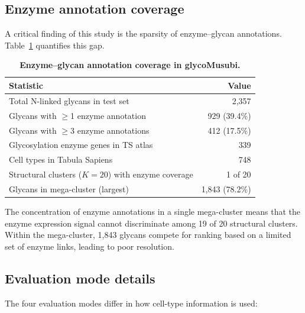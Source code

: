 \documentclass[11pt,a4paper]{article}
\begin{document}
\subsection{Enzyme annotation coverage}

A critical finding of this study is the sparsity of enzyme--glycan annotations.
Table~\ref{tab:enzyme_coverage} quantifies this gap.

\begin{table}[H]
\centering
\caption{\textbf{Enzyme--glycan annotation coverage in glycoMusubi.}}
\label{tab:enzyme_coverage}
\small
\begin{tabular}{lr}
\toprule
\textbf{Statistic} & \textbf{Value} \\
\midrule
Total N-linked glycans in test set      & 2,357 \\
Glycans with $\geq$1 enzyme annotation  & 929 (39.4\%) \\
Glycans with $\geq$3 enzyme annotations & 412 (17.5\%) \\
Glycosylation enzyme genes in TS atlas  & 339 \\
Cell types in Tabula Sapiens            & 748 \\
\midrule
Structural clusters ($K = 20$) with enzyme coverage & 1 of 20 \\
Glycans in mega-cluster (largest)       & 1,843 (78.2\%) \\
\bottomrule
\end{tabular}
\end{table}

The concentration of enzyme annotations in a single mega-cluster means that the
enzyme expression signal cannot discriminate among 19 of 20 structural clusters.
Within the mega-cluster, 1,843 glycans compete for ranking based on a limited
set of enzyme links, leading to poor resolution.

\subsection{Evaluation mode details}

The four evaluation modes differ in how cell-type information is used:
\end{document}
